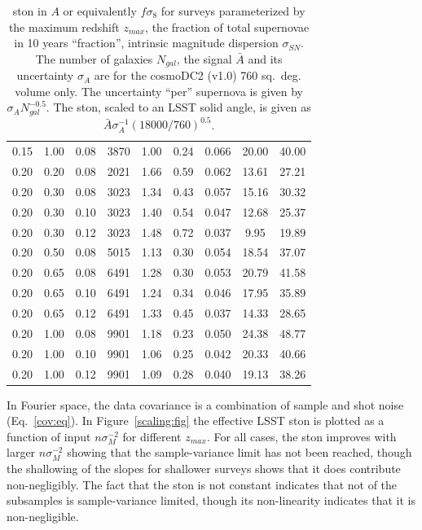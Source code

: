 \documentclass{aastex62}   	%
\begin{document}
\begin{table}
\begin{tabular}{|ccc|ccccc|c|}
0.15 & 1.00 & 0.08 & 3870 &   1.00 &   0.24 &  0.066 &  20.00 &  40.00\\
0.20 & 0.20 & 0.08 & 2021 &   1.66 &   0.59 &  0.062 &  13.61 &  27.21\\
0.20 & 0.30 & 0.08 & 3023 &   1.34 &   0.43 &  0.057 &  15.16 &  30.32\\
0.20 & 0.30 & 0.10 & 3023 &   1.40 &   0.54 &  0.047 &  12.68 &  25.37\\
0.20 & 0.30 & 0.12 & 3023 &   1.48 &   0.72 &  0.037 &   9.95 &  19.89\\
0.20 & 0.50 & 0.08 & 5015 &   1.13 &   0.30 &  0.054 &  18.54 &  37.07\\
0.20 & 0.65 & 0.08 & 6491 &   1.28 &   0.30 &  0.053 &  20.79 &  41.58\\
0.20 & 0.65 & 0.10 & 6491 &   1.24 &   0.34 &  0.046 &  17.95 &  35.89\\
0.20 & 0.65 & 0.12 & 6491 &   1.33 &   0.45 &  0.037 &  14.33 &  28.65\\
0.20 & 1.00 & 0.08 & 9901 &   1.18 &   0.23 &  0.050 &  24.38 &  48.77\\
0.20 & 1.00 & 0.10 & 9901 &   1.06 &   0.25 &  0.042 &  20.33 &  40.66\\
0.20 & 1.00 & 0.12 & 9901 &   1.09 &   0.28 &  0.040 &  19.13 &  38.26\\
    \hline
   \end{tabular}
   \caption{ston in $A$ or equivalently $f\sigma_8$ for surveys parameterized by the maximum redshift $z_{max}$,
   the fraction of total supernovae in 10 years ``fraction'', intrinsic magnitude dispersion $\sigma_{SN}$.  The number of galaxies
   $N_{gal}$, the signal $\bar{A}$ and its uncertainty $\sigma_A$ are for the cosmoDC2 (v1.0) 760 sq.~deg. volume only.
   The uncertainty ``per'' supernova is given by  $\sigma_A N_{gal}^{-0.5}$.  The ston, scaled to an LSST solid angle, is given as 
    $\bar{A} \sigma_A^{-1} (18000/760)^{0.5}$.
   \label{tab:subsets}}
\end{table}

In Fourier space, the data covariance is a combination of sample and shot noise (Eq.~\ref{cov:eq}).
In Figure~\ref{scaling:fig} the effective LSST ston is plotted as a function of input $n \sigma^{-2}_M$ for different $z_{max}$.
For all cases, the ston improves with larger $n \sigma^{-2}_M$ showing that the sample-variance limit has not been reached,
though the shallowing of the slopes for shallower surveys shows that it does contribute non-negligibly.
The fact that the ston is not constant indicates that not of the subsamples is sample-variance limited, though its non-linearity
indicates that it is non-negligible.
\end{document}
